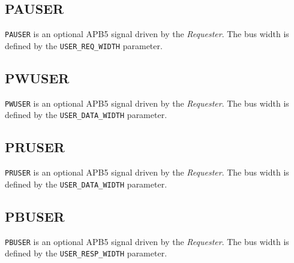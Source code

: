 \subsection{PAUSER}\label{pauser}

\texttt{PAUSER} is an optional APB5 signal driven by the \emph{Requester}. The bus width is defined by the \texttt{USER\_REQ\_WIDTH} parameter.

\subsection{PWUSER}\label{pwuser}

\texttt{PWUSER} is an optional APB5 signal driven by the \emph{Requester}. The bus width is defined by the \texttt{USER\_DATA\_WIDTH} parameter.

\subsection{PRUSER}\label{pruser}

\texttt{PRUSER} is an optional APB5 signal driven by the \emph{Requester}. The bus width is defined by the \texttt{USER\_DATA\_WIDTH} parameter.

\subsection{PBUSER}\label{pbuser}

\texttt{PBUSER} is an optional APB5 signal driven by the \emph{Requester}. The bus width is defined by the \texttt{USER\_RESP\_WIDTH} parameter.